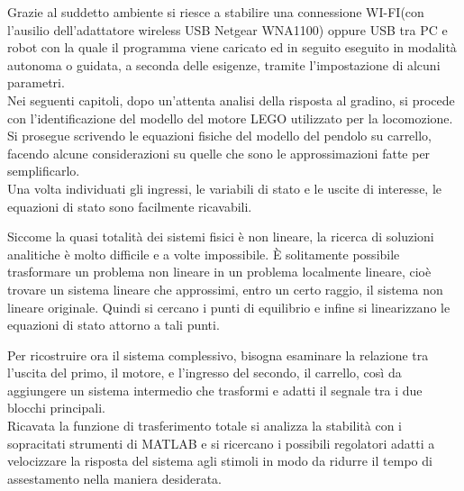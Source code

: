 Grazie al suddetto ambiente si riesce a stabilire una connessione WI-FI(con l'ausilio dell'adattatore wireless USB Netgear WNA1100) oppure USB tra PC e robot con la quale il programma viene caricato ed in seguito eseguito in modalità autonoma o guidata, a seconda delle esigenze, tramite l'impostazione di alcuni parametri.\\

Nei seguenti capitoli, dopo un'attenta analisi della risposta al gradino, si procede con l'identificazione del modello del motore LEGO utilizzato per la locomozione.\\
Si prosegue scrivendo le equazioni fisiche del modello del pendolo su carrello, facendo alcune considerazioni su quelle che sono le approssimazioni fatte per semplificarlo.\\
Una volta individuati gli ingressi, le variabili di stato e le uscite di interesse, le equazioni di stato sono facilmente ricavabili.

Siccome la quasi totalità dei sistemi fisici è non lineare, la ricerca di soluzioni analitiche è molto difficile e a volte impossibile. È solitamente possibile trasformare un problema non lineare in un problema localmente lineare, cioè trovare un sistema lineare che approssimi, entro un certo raggio, il sistema non lineare originale.
Quindi si cercano i punti di equilibrio e infine si linearizzano le equazioni di stato attorno a tali punti.

Per ricostruire ora il sistema complessivo, bisogna esaminare la relazione tra l'uscita del primo, il motore, e l'ingresso del secondo, il carrello, così da aggiungere un sistema intermedio che trasformi e adatti il segnale tra i due blocchi principali.\\
Ricavata la funzione di trasferimento totale si analizza la stabilità con i sopracitati strumenti di MATLAB e si ricercano  i possibili regolatori adatti a velocizzare la risposta del sistema agli stimoli in modo da ridurre il tempo di assestamento nella maniera desiderata.\\



